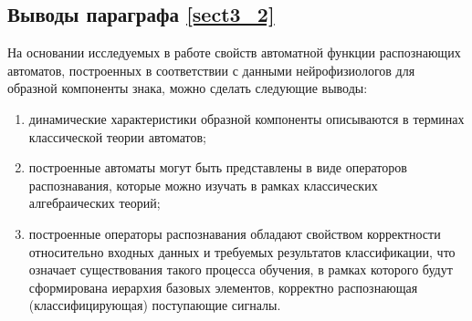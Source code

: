 \subsection{Выводы параграфа \ref{sect3_2}}
На основании исследуемых в работе свойств автоматной функции распознающих автоматов, построенных в соответствии с данными нейрофизиологов для образной компоненты знака, можно сделать следующие выводы:
\begin{enumerate}
\item 
	динамические характеристики образной компоненты описываются в терминах классической теории автоматов;
\item
	построенные автоматы могут быть представлены в виде операторов распознавания, которые можно изучать в рамках классических алгебраических теорий;
\item
	построенные операторы распознавания обладают свойством корректности относительно входных данных и требуемых результатов классификации, что означает существования такого процесса обучения, в рамках которого будут сформирована иерархия базовых элементов, корректно распознающая (классифицирующая) поступающие сигналы.
\end{enumerate}

\clearpage
